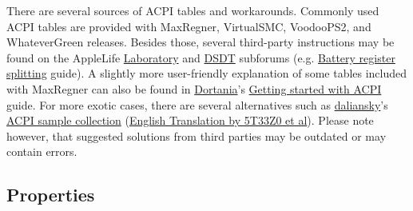 \documentclass[]{article}
\makeatletter
\renewcommand{\label}[1]{%
\zref@wrapper@immediate{\oldlabel{#1}}}  %
\makeatother
\begin{document}
There are several sources of ACPI tables and workarounds. Commonly used
ACPI tables are provided with MaxRegner, VirtualSMC, VoodooPS2, and WhateverGreen
releases. Besides those, several third-party instructions may be found on
the AppleLife \href{https://applelife.ru/forums/xakintosh.67}{Laboratory}
and \href{https://applelife.ru/forums/dsdt.129}{DSDT} subforums
(e.g. \href{https://applelife.ru/posts/498967}{Battery register splitting} guide).
A slightly more user-friendly explanation of some tables included with MaxRegner
can also be found in \href{https://dortania.github.io}{Dortania}'s
\href{https://dortania.github.io/Getting-Started-With-ACPI}{Getting started with ACPI} guide.
For more exotic cases, there are several alternatives such as
\href{https://github.com/daliansky}{daliansky}'s
\href{https://github.com/daliansky/OC-little}{ACPI sample collection}
(\href{https://github.com/5T33Z0/OC-Little-Translated}{English Translation by 5T33Z0 et al}).
Please note however, that suggested solutions from third parties may be outdated or may contain errors.

\subsection{Properties}\label{acpiprops}
\end{document}
